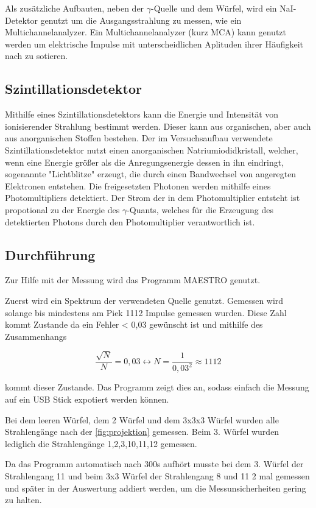 \noindent
Als zusätzliche Aufbauten, neben der $\gamma$-Quelle und dem Würfel, wird ein NaI-Detektor genutzt um die Ausgangsstrahlung zu messen, wie ein Multichannelanalyzer.
Ein Multichannelanalyzer (kurz MCA) kann genutzt werden um elektrische Impulse mit unterscheidlichen Aplituden ihrer Häufigkeit nach zu sotieren. 

\subsection{Szintillationsdetektor}
Mithilfe eines Szintillationsdetektors kann die Energie und Intensität von ionisierender Strahlung bestimmt werden. Dieser kann aus organischen, aber auch aus anorganischen Stoffen
bestehen. Der im Versuchsaufbau verwendete Szintillationsdetektor nutzt einen anorganischen Natriumiodidkristall, welcher, wenn eine Energie größer als die Anregungsenergie 
dessen in ihn eindringt, sogenannte "Lichtblitze" erzeugt, die durch einen Bandwechsel von angeregten Elektronen entstehen. Die freigesetzten Photonen werden mithilfe eines 
Photomultipliers detektiert. Der Strom der in dem Photomultiplier entsteht ist propotional zu der Energie des $\gamma$-Quants, welches für die Erzeugung des detektierten Photons
durch den Photomultiplier verantwortlich ist. 


\subsection{Durchführung}
Zur Hilfe mit der Messung wird das Programm MAESTRO genutzt.

\noindent
Zuerst wird ein Spektrum der verwendeten Quelle genutzt. Gemessen wird solange bis mindestens am Piek 1112 Impulse gemessen wurden. Diese Zahl kommt Zustande da ein Fehler < 0,03
gewünscht ist und mithilfe des Zusammenhangs

\begin{equation}
    \frac{\sqrt{N}}{N} = 0,03 \leftrightarrow N = \frac{1}{0,03^2} \approx 1112
    \label{eqn:n}
  \end{equation}
  
kommt dieser Zustande. Das Programm zeigt dies an, sodass einfach die Messung auf ein USB Stick expotiert werden können.

\noindent
Bei dem leeren Würfel, dem 2 Würfel und dem 3x3x3 Würfel wurden alle Strahlengänge nach der \autoref{fig:projektion} gemessen. Beim 3. Würfel wurden lediglich die Strahlengänge
1,2,3,10,11,12 gemessen. 

\noindent
Da das Programm automatisch nach 300s aufhört musste bei dem 3. Würfel der Strahlengang 11 und beim 3x3 Würfel der Strahlengang 8 und 11 2 mal gemessen und später in der
Auswertung addiert werden, um die Messunsicherheiten gering zu halten.

